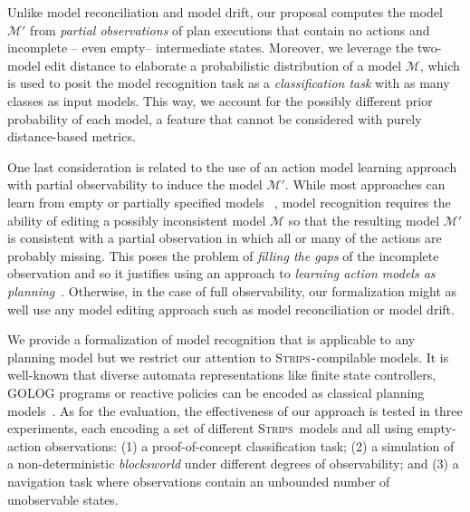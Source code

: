 \documentclass[letterpaper]{article} %
\newcommand{\strips}{\textsc{Strips}}     %
\begin{document}
Unlike model reconciliation and model drift, our proposal computes the model $\mathcal{M'}$ from \emph{partial observations} of plan executions that contain no actions and incomplete -- even empty-- intermediate states. Moreover, we leverage the two-model edit distance to elaborate a probabilistic distribution of a model $\mathcal{M}$, which is used to posit the model recognition task as a \emph{classification task} with as many classes as input models. This way, we account for the possibly different prior probability of each model, a feature that cannot be considered with purely distance-based metrics.


One last consideration is related to the use of an action model learning approach with partial observability to induce the model $\mathcal{M'}$. While most approaches can learn from empty or partially specified models ~\cite{yang2007learning,AmirC08,cresswell2013acquiring}, model recognition requires the ability of editing a possibly inconsistent model $\mathcal{M}$ so that the resulting model $\mathcal{M'}$ is consistent with a partial observation in which all or many of the actions are probably missing. This poses the problem of \emph{filling the gaps} of the incomplete observation and so it justifies using an approach to \emph{learning action models as planning}~\cite{aineto2018learning}. Otherwise, in the case of full observability, our formalization might as well use any model editing approach such as model reconciliation or model drift.

We provide a formalization of model recognition that is applicable to any planning model but we restrict our attention to \strips\texttt{-}compilable models. It is well-known that diverse automata representations like finite state controllers, {\sc GOLOG} programs or reactive policies can be encoded as classical planning models~\cite{BaierFM07,Geffner:FSM:AAAI10,segovia2018computing,segovia2019computing}. As for the evaluation, the effectiveness of our approach is tested in three experiments, each encoding a set of different \strips\ models and all using empty-action observations: (1) a proof-of-concept classification task; (2) a simulation of a non-deterministic \emph{blocksworld} under different degrees of observability; and (3) a navigation task where observations contain an unbounded number of unobservable states.
\end{document}
